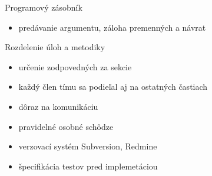 \documentclass[pdf,fyma2,total]{prosper}
\begin{document}

\begin{slide}{Programový zásobník}
    \begin{small}
        \begin{itemize}
            \item{predávanie argumentu, záloha premenných a návrat}
        \end{itemize}
    \end{small}

    \begin{figure}[h!]
    \begin{center}
    \end{center}
    \end{figure}
\end{slide}


\begin{slide}{Rozdelenie úloh a metodiky}
\begin{small}

    \bigskip
    \begin{itemize}
        \item{určenie zodpovedných za sekcie}
        \bigskip
        \item{každý člen tímu sa podieľal aj na ostatných častiach}
        \bigskip
        \item{dôraz na komunikáciu}
        \bigskip
        \item{pravidelné osobné schôdze}
        \bigskip
        \item{verzovací systém Subversion, Redmine}
        \bigskip
        \item{špecifikácia testov pred implemetáciou}
    \end{itemize}

\end{small}
\end{slide}
\end{document}
